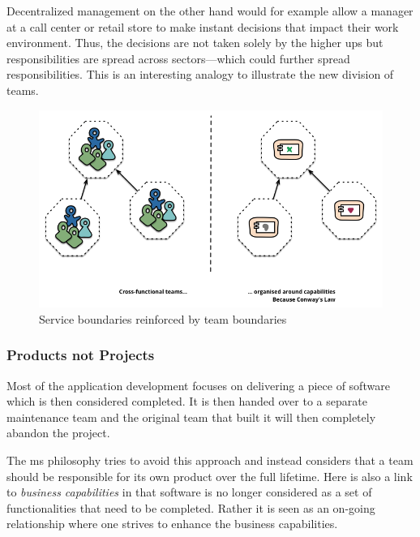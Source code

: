 Decentralized management on the other hand would for example allow a
manager at a call center or retail store to make instant decisions
that impact their work environment. Thus, the decisions are not taken
solely by the higher ups but responsibilities are spread across
sectors—which could further spread responsibilities. This is an
interesting analogy to illustrate the new division of teams.

\begin{figure}
	\centering
	\includegraphics[width=\linewidth]{images/PreferFunctionalStaffOrganization.png}
	\caption{Service boundaries reinforced by team boundaries \cite{ms-definition}}
	\label{fig:team-boundaries}
\end{figure}

\subsubsection{Products not Projects}

Most of the application development focuses on delivering a piece of
software which is then considered completed. It is then handed over to
a separate maintenance team and the original team that built it will
then completely abandon the project. \cite{ms-definition}

The \gls{ms} philosophy tries to avoid this approach and instead
considers that a team should be responsible for its own product over
the full lifetime. Here is also a link to \textit{business
capabilities} in that software is no longer considered as a set of
functionalities that need to be completed. Rather it is seen as an
on-going relationship where one strives to enhance the business
capabilities.  \cite{ms-definition}


